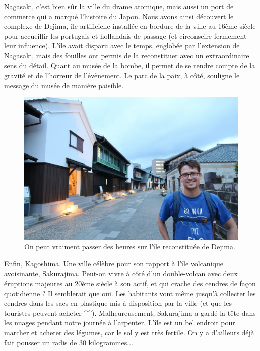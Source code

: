 Nagasaki, c'est bien sûr la ville du drame atomique, mais aussi un port
de commerce qui a marqué l'histoire du Japon. Nous avons ainsi découvert
le complexe de Dejima, île artificielle installée en bordure de la ville
au 16ème siècle pour accueillir les portugais et hollandais de passage
(et circonscire fermement leur influence). L'île avait disparu avec le
temps, englobée par l'extension de Nagasaki, mais des fouilles ont
permis de la reconstituer avec un extraordinaire sens du détail. Quant
au musée de la bombe, il permet de se rendre compte de la gravité et de
l'horreur de l'évènement. Le parc de la paix, à côté, souligne le
message du musée de manière paisible.

\begin{figure}
\centering
\includegraphics{images/20180709_dejima.JPG}
\caption{On peut vraiment passer des heures sur l'île reconstituée de
Dejima.}
\end{figure}

Enfin, Kagoshima. Une ville célèbre pour son rapport à l'île volcanique
avoisinante, Sakurajima. Peut-on vivre à côté d'un double-volcan avec
deux éruptions majeures au 20ème siècle à son actif, et qui crache des
cendres de façon quotidienne ? Il semblerait que oui. Les habitants vont
même jusqu'à collecter les cendres dans les sacs en plastique mis à
disposition par la ville (et que les touristes peuvent acheter
\^{}\^{}). Malheureusement, Sakurajima a gardé la tête dans les nuages
pendant notre journée à l'arpenter. L'île est un bel endroit pour
marcher et acheter des légumes, car le sol y est très fertile. On y a
d'ailleurs déjà fait pousser un radis de 30 kilogrammes...

